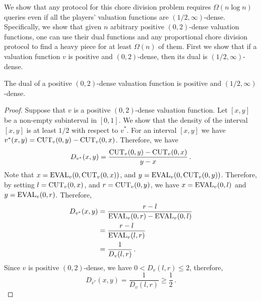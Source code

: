 We show that any protocol for this chore division problem requires $\Omega ( n \log n)$ queries even if all the players' valuation functions are $(1/2,\infty)$-dense. Specifically, we show that given $n$ arbitrary positive $(0,2)$-dense valuation functions, one can use their dual functions and any proportional chore division protocol to find a heavy piece for at least $\Omega(n)$ of them. First we show that if a valuation function $v$ is positive and $(0,2)$-dense, then its dual is $(1/2,\infty)$-dense.

\begin{lemma}
\label{dual}
The dual of a positive $(0,2)$-dense valuation function is positive and $(1/2,\infty)$-dense.
\end{lemma}
\begin{proof}
Suppose that $v$ is a positive $(0,2)$-dense valuation function. Let $[x,y]$ be a non-empty subinterval in $[0,1]$. We show that the density of the interval $[x,y]$ is at least $1/2$ with respect to $v^{*}$. For an interval $[x,y]$ we have $v^*(x,y)= {\operatorname{CUT}}_v(0,y)-{\operatorname{CUT}}_v(0,x)$. Therefore, we have
$$
D_{v^*} (x,y) = \dfrac{{\operatorname{CUT}}_v(0,y)-{\operatorname{CUT}}_v(0,x)}{y-x} \,.
$$
Note that $x={\operatorname{EVAL}}_v(0, {\operatorname{CUT}}_v(0,x))$, and $y={\operatorname{EVAL}}_v(0, {\operatorname{CUT}}_v(0,y))$. Therefore, by setting $l= {\operatorname{CUT}}_v(0,x)$, and $r = {\operatorname{CUT}}_v(0,y)$, we have $x={\operatorname{EVAL}}_v(0,l)$ and $y={\operatorname{EVAL}}_v(0,r)$. Therefore,
\begin{align*}
D_{v^*} (x,y) &= \dfrac{r-l}{{\operatorname{EVAL}}_v(0,r)-{\operatorname{EVAL}}_v(0,l)}\\
&= \dfrac{r-l}{{\operatorname{EVAL}}_v(l,r)} \\
&= \dfrac{1}{D_v(l,r)} \,.
\end{align*}
Since $v$ is positive $(0,2)$-dense, we have $0 < D_v(l,r) \le 2$, therefore,
$$
D_{v^*} (x,y) = \dfrac{1}{D_v(l,r)} \ge \dfrac{1}{2} \,.
$$
\end{proof}


